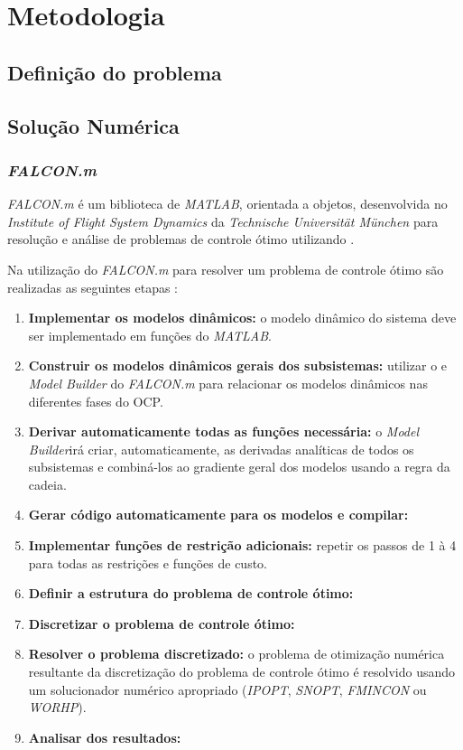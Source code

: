 \chapter{Metodologia}
\label{chap:metodologia}
\thispagestyle{empty}

\section{Definição do problema}

\section{Solução Numérica}

\subsection{\textit{FALCON.m}}

\textit{FALCON.m} é um biblioteca de \textit{MATLAB}\textsuperscript{\textregistered}, orientada a objetos, desenvolvida no \textit{Institute of Flight System Dynamics} da \textit{Technische Universit{\"a}t M{\"u}nchen} para resolução e análise de problemas de controle ótimo utilizando \cite{manual:Falcon}.



Na utilização do \textit{FALCON.m} para resolver um problema de controle ótimo são realizadas as seguintes etapas \cite{phd:Matthias}:

\begin{enumerate}
    \item \textbf{Implementar os modelos dinâmicos:} o modelo dinâmico do sistema deve ser implementado em funções do \textit{MATLAB}\textsuperscript{\textregistered}. 
    \item \textbf{Construir os modelos dinâmicos gerais dos subsistemas:} utilizar o e \textit{Model Builder} do \textit{FALCON.m} para relacionar os modelos dinâmicos nas diferentes fases do OCP.
    \item \textbf{Derivar automaticamente todas as funções necessária:} o \textit{Model Builder}irá criar, automaticamente, as derivadas analíticas de todos os subsistemas e combiná-los ao gradiente geral dos modelos usando a regra da cadeia.
    \item \textbf{Gerar código automaticamente para os modelos e compilar:}
    \item \textbf{Implementar funções de restrição adicionais:} repetir os passos de 1 à 4 para todas as restrições e funções de custo.
    \item \textbf{Definir a estrutura do problema de controle ótimo:}
    \item \textbf{Discretizar o problema de controle ótimo:}
    \item \textbf{Resolver o problema discretizado:} o problema de otimização numérica resultante da discretização do problema de controle ótimo é resolvido usando um solucionador numérico apropriado (\textit{IPOPT}, \textit{SNOPT}, \textit{FMINCON} ou \textit{WORHP}).
    \item \textbf{Analisar dos resultados:}
\end{enumerate}

